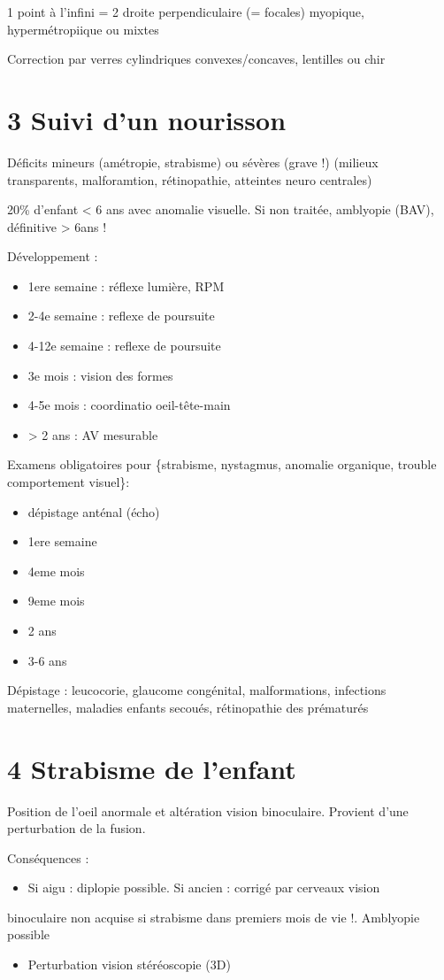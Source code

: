 \documentclass[11pt]{article}
\begin{document}
1 point à l'infini = 2 droite perpendiculaire (= focales) \thus myopique,
hypermétropiique ou mixtes

Correction par verres cylindriques convexes/concaves, lentilles ou chir

\section{3 Suivi d'un nourisson}
\label{sec:org876d6d7}
Déficits mineurs (amétropie, strabisme) ou sévères (grave !) (milieux transparents,
  malforamtion, rétinopathie, atteintes neuro centrales)

20\% d'enfant < 6 ans avec anomalie visuelle. Si non traitée, amblyopie (BAV),
définitive > 6ans !

Développement :
\begin{itemize}
\item 1ere semaine : réflexe lumière, RPM
\item 2-4e semaine : reflexe de poursuite
\item 4-12e semaine : reflexe de poursuite
\item 3e mois : vision des formes
\item 4-5e mois : coordinatio oeil-tête-main
\item > 2 ans : AV mesurable
\end{itemize}
Examens obligatoires pour \{strabisme, nystagmus, anomalie organique, trouble
comportement visuel\}:
\begin{itemize}
\item dépistage anténal (écho)
\item 1ere semaine
\item 4eme mois
\item 9eme mois
\item 2 ans
\item 3-6 ans
\end{itemize}

Dépistage : leucocorie, glaucome congénital, malformations, infections
maternelles, maladies enfants secoués, rétinopathie des prématurés
\section{4 Strabisme de l'enfant}
\label{sec:org3d09c9c}

Position de l'oeil anormale et altération vision binoculaire. Provient d'une
perturbation de la fusion.

Conséquences :
\begin{itemize}
\item Si aigu : diplopie possible. Si ancien : corrigé par cerveaux \thus vision
\end{itemize}
binoculaire non acquise si strabisme dans premiers mois de vie !. Amblyopie
possible
\begin{itemize}
\item Perturbation vision stéréoscopie (3D)
\end{itemize}
\end{document}
